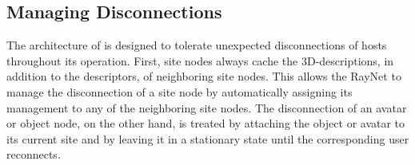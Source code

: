 \subsection{Managing Disconnections}
The architecture of \sol is designed to tolerate unexpected
disconnections of hosts throughout its operation. First, site nodes
always cache the 3D-descriptions, in addition to the descriptors, of
neighboring site nodes. This allows the RayNet to manage the
disconnection of a site node by automatically assigning its management
to any of the neighboring site nodes. The disconnection of an avatar
or object node, on the other hand, is treated by attaching the object
or avatar to its current site and by leaving it in a stationary state
until the corresponding user reconnects.









